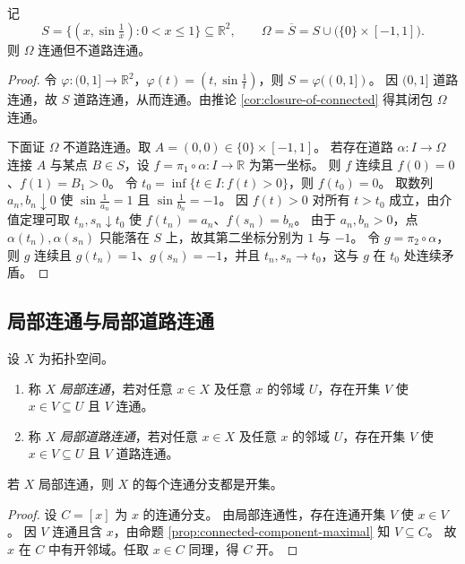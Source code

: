 \documentclass[lang=cn,a4paper,newtx,figureplace=section,tableplace=section]{elegantbook}
\begin{document}
\begin{example}\label{ex:topologist-sine-curve}
  记
  \[
    S=\{(x,\sin\tfrac1x):0<x\le 1\}\subseteq\mathbb R^2,\qquad \Omega=\overline{S}=S\cup\big(\{0\}\times[-1,1]\big).
  \]
  则 $\Omega$ 连通但不道路连通。
\end{example}
\begin{proof}
  令 $\varphi:(0,1]\to\mathbb R^2$，$\varphi(t)=(t,\sin\tfrac1t)$，则 $S=\varphi((0,1])$。
  因 $(0,1]$ 道路连通，故 $S$ 道路连通，从而连通。由推论 \ref{cor:closure-of-connected} 得其闭包 $\Omega$ 连通。

  下面证 $\Omega$ 不道路连通。取 $A=(0,0)\in\{0\}\times[-1,1]$。
  若存在道路 $\alpha:I\to\Omega$ 连接 $A$ 与某点 $B\in S$，设 $f=\pi_1\circ\alpha:I\to\mathbb R$ 为第一坐标。
  则 $f$ 连续且 $f(0)=0$、$f(1)=B_1>0$。
  令 $t_0=\inf\{t\in I:f(t)>0\}$，则 $f(t_0)=0$。
  取数列 $a_n,b_n\downarrow 0$ 使 $\sin\tfrac1{a_n}=1$ 且 $\sin\tfrac1{b_n}=-1$。
  因 $f(t)>0$ 对所有 $t>t_0$ 成立，由介值定理可取 $t_n,s_n\downarrow t_0$ 使 $f(t_n)=a_n$、$f(s_n)=b_n$。
  由于 $a_n,b_n>0$，点 $\alpha(t_n),\alpha(s_n)$ 只能落在 $S$ 上，故其第二坐标分别为 $1$ 与 $-1$。
  令 $g=\pi_2\circ\alpha$，则 $g$ 连续且 $g(t_n)=1$、$g(s_n)=-1$，并且 $t_n,s_n\to t_0$，这与 $g$ 在 $t_0$ 处连续矛盾。
\end{proof}

\subsection{局部连通与局部道路连通}

\begin{definition}[局部连通与局部道路连通]\label{def:local-connected}
  设 $X$ 为拓扑空间。
  \begin{enumerate}
    \item 称 $X$ \emph{局部连通}，若对任意 $x\in X$ 及任意 $x$ 的邻域 $U$，存在开集 $V$ 使 $x\in V\subseteq U$ 且 $V$ 连通。
    \item 称 $X$ \emph{局部道路连通}，若对任意 $x\in X$ 及任意 $x$ 的邻域 $U$，存在开集 $V$ 使 $x\in V\subseteq U$ 且 $V$ 道路连通。
  \end{enumerate}
\end{definition}

\begin{proposition}\label{prop:components-open-locally-connected}
  若 $X$ 局部连通，则 $X$ 的每个连通分支都是开集。
\end{proposition}
\begin{proof}
  设 $C=[x]$ 为 $x$ 的连通分支。
  由局部连通性，存在连通开集 $V$ 使 $x\in V$。
  因 $V$ 连通且含 $x$，由命题 \ref{prop:connected-component-maximal} 知 $V\subseteq C$。
  故 $x$ 在 $C$ 中有开邻域。任取 $x\in C$ 同理，得 $C$ 开。
\end{proof}
\end{document}
